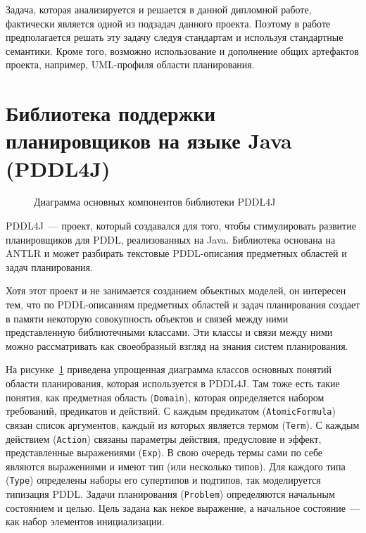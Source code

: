 Задача, которая анализируется и решается в данной дипломной работе, фактически является одной из подзадач данного проекта. Поэтому в работе  предполагается решать эту задачу следуя стандартам и используя стандартные семантики. Кроме того, возможно использование и дополнение общих артефактов проекта, например, UML-профиля области планирования.

\section{Библиотека поддержки планировщиков на языке Java (PDDL4J)}

\begin{figure}[h!]
    \caption{Диаграмма основных компонентов библиотеки PDDL4J}
    \label{img:pddl4j}

\end{figure}   

PDDL4J~--- проект, который создавался для того, чтобы стимулировать развитие планировщиков для PDDL, реализованных на Java\cite{pddl4j}. Библиотека основана на ANTLR\cite{antlr} и может разбирать текстовые PDDL-описания предметных областей и задач планирования. 

Хотя этот проект и не занимается созданием объектных моделей, он интересен тем, что по PDDL-описаниям предметных областей и задач планирования создает в памяти некоторую совокупность объектов и связей между ними представленную библиотечными классами. Эти классы и связи между ними можно рассматривать как своеобразный взгляд на знания систем планирования. 

На рисунке~\ref{img:pddl4j} приведена упрощенная диаграмма классов основных понятий области планирования, которая используется в PDDL4J.
Там тоже есть такие понятия, как предметная область (\texttt{Domain}), которая определяется набором требований, предикатов и действий. С каждым предикатом (\texttt{AtomicFormula}) связан список аргументов, каждый из которых является термом (\texttt{Term}). С каждым действием (\texttt{Action}) связаны параметры действия, предусловие и эффект, представленные выражениями (\texttt{Exp}). В свою очередь термы сами по себе являются выражениями и имеют тип (или несколько типов). Для каждого типа (\texttt{Type}) определены наборы его супертипов и подтипов, так моделируется типизация PDDL. Задачи планирования (\texttt{Problem}) определяются начальным состоянием и целью. Цель задана как некое выражение, а начальное состояние~--- как набор элементов инициализации.

